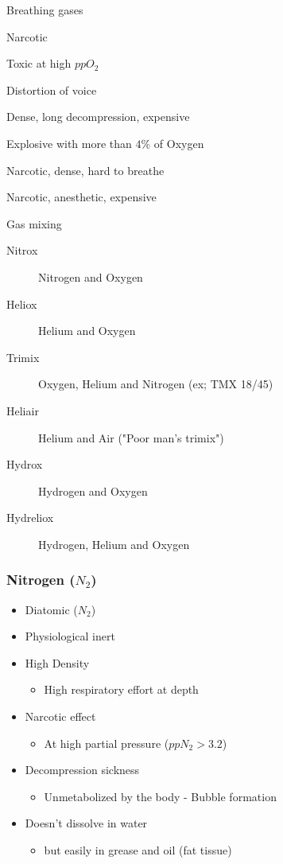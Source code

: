 \documentclass[aspectratio=1610,english,12pt]{beamer}
\begin{document}
\begin{frame}{Breathing gases}
	\begin{description}[lalign=parleft]
		\item[Nitrogen ($N_2$)]Narcotic
		\item[Oxygen ($O_2$)]Toxic at high $ppO_2$
		\item[Helium ($He$)]Distortion of voice 
		\item[Neon ($Ne$)] Dense, long decompression, expensive 
		\item[Hydrogen ($H$)] Explosive with more than $4\%$ of Oxygen
		\item[Argon ($Ar$)]Narcotic, dense, hard to breathe
		\item[Xenon ($Xe$)]Narcotic, anesthetic, expensive
	\end{description}
\end{frame}

\begin{frame}{Gas mixing}
	\begin{description}
		\item[Nitrox]Nitrogen and Oxygen
		\item[Heliox]Helium and Oxygen
		\item[Trimix]Oxygen, Helium and Nitrogen (ex; TMX 18/45)
		\item[Heliair]Helium and Air ("Poor man's trimix")
		\item[Hydrox]Hydrogen and Oxygen
 		\item[Hydreliox]Hydrogen, Helium and Oxygen
	\end{description}
\end{frame}

\subsubsection{Nitrogen ($N_2$)}
\begin{frame}{\insertsubsubsection}
	\begin{itemize}
		\item Diatomic ($N_2$)
		\item Physiological inert
		\item High Density
		\begin{itemize}\item High respiratory effort at depth\end{itemize}
		\item Narcotic effect
		\begin{itemize}\item At high partial pressure ($ppN_2 > 3.2$)\end{itemize}
		\item Decompression sickness
		\begin{itemize}\item Unmetabolized by the body - Bubble formation\end{itemize}
		\item Doesn't dissolve in water
		\begin{itemize}\item but easily in grease and oil (fat tissue)\end{itemize}
	\end{itemize}
\end{frame}
\end{document}
